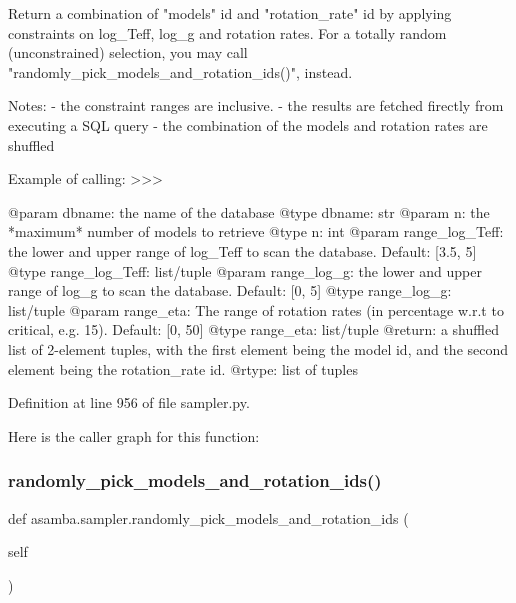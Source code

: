 \begin{DoxyVerb}Return a combination of "models" id and "rotation_rate" id by applying constraints on log_Teff,
log_g and rotation rates. For a totally random (unconstrained) 
selection, you may call "randomly_pick_models_and_rotation_ids()", instead. 

Notes:
- the constraint ranges are inclusive. 
- the results are fetched firectly from executing a SQL query
- the combination of the models and rotation rates are shuffled

Example of calling:
>>>

@param dbname: the name of the database
@type dbname: str
@param n: the *maximum* number of models to retrieve
@type n: int
@param range_log_Teff: the lower and upper range of log_Teff to scan the database. Default: [3.5, 5]
@type range_log_Teff: list/tuple
@param range_log_g: the lower and upper range of log_g to scan the database. Default: [0, 5]
@type range_log_g: list/tuple
@param range_eta: The range of rotation rates (in percentage w.r.t to critical, e.g. 15). 
       Default: [0, 50]
@type range_eta: list/tuple
@return: a shuffled list of 2-element tuples, with the first element being the model id, and the
       second element being the rotation_rate id.
@rtype: list of tuples
\end{DoxyVerb}
 

Definition at line 956 of file sampler.\+py.

Here is the caller graph for this function\+:
\mbox{\label{namespaceasamba_1_1sampler_a75d171190ae15adb0e2c6fabf2c04e7a}} 
\subsubsection{\texorpdfstring{randomly\+\_\+pick\+\_\+models\+\_\+and\+\_\+rotation\+\_\+ids()}{randomly\_pick\_models\_and\_rotation\_ids()}}
{\footnotesize\ttfamily def asamba.\+sampler.\+randomly\+\_\+pick\+\_\+models\+\_\+and\+\_\+rotation\+\_\+ids (\begin{DoxyParamCaption}\item[{}]{self }\end{DoxyParamCaption})}

